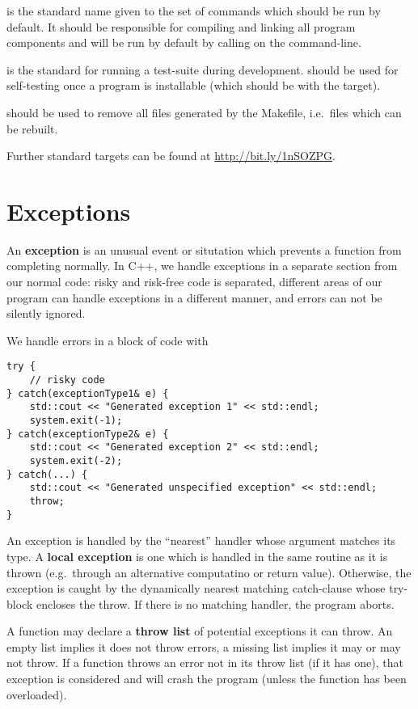 \documentclass[12pt]{article}
\begin{document}
 is the standard name given to the set of commands which should be run by default. It should be responsible for compiling and linking all program components and will be run by default by calling  on the command-line.

 is the standard for running a test-suite during development.  should be used for self-testing once a program is installable (which should be with the  target).

 should be used to remove all files generated by the Makefile, i.e.\ files which can be rebuilt.

Further standard targets can be found at \url{http://bit.ly/1nSOZPG}.

\section{Exceptions}
An {\bf exception} is an unusual event or situtation which prevents a function from completing normally. In C++, we handle exceptions in a separate section from our normal code: risky and risk-free code is separated, different areas of our program can handle exceptions in a different manner, and errors can not be silently ignored.

We handle errors in a block of code with
\begin{lstlisting}
try {
    // risky code
} catch(exceptionType1& e) {
    std::cout << "Generated exception 1" << std::endl;
    system.exit(-1);
} catch(exceptionType2& e) {
    std::cout << "Generated exception 2" << std::endl;
    system.exit(-2);
} catch(...) {
    std::cout << "Generated unspecified exception" << std::endl;
    throw;
}
\end{lstlisting}

An exception is handled by the ``nearest'' handler whose argument matches its type. A {\bf local exception} is one which is handled in the same routine as it is thrown (e.g.\ through an alternative computatino or return value). Otherwise, the exception is caught by the dynamically nearest matching catch-clause whose try-block encloses the throw. If there is no matching handler, the program aborts.

A function may declare a {\bf throw list} of potential exceptions it can throw. An empty list implies it does not throw errors, a missing list implies it may or may not throw. If a function throws an error not in its throw list (if it has one), that exception is considered  and will crash the program (unless the  function has been overloaded).
\end{document}
